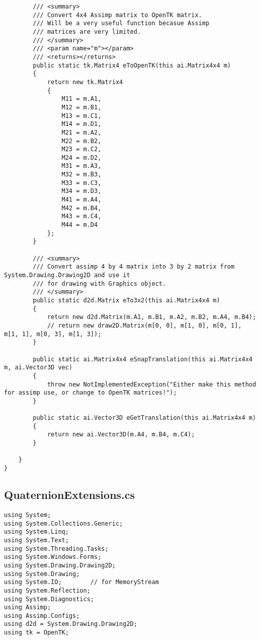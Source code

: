 \begin{scriptsize}
\begin{verbatim}
        /// <summary>
        /// Convert 4x4 Assimp matrix to OpenTK matrix.
        /// Will be a very useful function becasue Assimp 
        /// matrices are very limited.
        /// </summary>
        /// <param name="m"></param>
        /// <returns></returns>
        public static tk.Matrix4 eToOpenTK(this ai.Matrix4x4 m)
        {
            return new tk.Matrix4
            {
                M11 = m.A1,
                M12 = m.B1,
                M13 = m.C1,
                M14 = m.D1,
                M21 = m.A2,
                M22 = m.B2,
                M23 = m.C2,
                M24 = m.D2,
                M31 = m.A3,
                M32 = m.B3,
                M33 = m.C3,
                M34 = m.D3,
                M41 = m.A4,
                M42 = m.B4,
                M43 = m.C4,
                M44 = m.D4
            };
        }

        /// <summary>
        /// Convert assimp 4 by 4 matrix into 3 by 2 matrix from System.Drawing.Drawing2D and use it
        /// for drawing with Graphics object.
        /// </summary>
        public static d2d.Matrix eTo3x2(this ai.Matrix4x4 m)
        {
            return new d2d.Matrix(m.A1, m.B1, m.A2, m.B2, m.A4, m.B4);
            // return new draw2D.Matrix(m[0, 0], m[1, 0], m[0, 1], m[1, 1], m[0, 3], m[1, 3]);
        }

        public static ai.Matrix4x4 eSnapTranslation(this ai.Matrix4x4 m, ai.Vector3D vec)
        {
            throw new NotImplementedException("Either make this method for assimp use, or change to OpenTK matrices!");
        }

        public static ai.Vector3D eGetTranslation(this ai.Matrix4x4 m)
        {
            return new ai.Vector3D(m.A4, m.B4, m.C4);
        }

    }
}

\end{verbatim}
\subsection{QuaternionExtensions.cs}
\begin{verbatim}
using System;
using System.Collections.Generic;
using System.Linq;
using System.Text;
using System.Threading.Tasks;
using System.Windows.Forms;
using System.Drawing.Drawing2D;
using System.Drawing;
using System.IO;        // for MemoryStream
using System.Reflection;
using System.Diagnostics;
using Assimp;
using Assimp.Configs;
using d2d = System.Drawing.Drawing2D;
using tk = OpenTK;


\end{verbatim}
\end{scriptsize}
